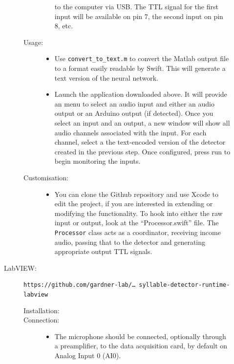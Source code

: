 \documentclass[10pt,letterpaper]{article}
\begin{document}
\begin{description}
\begin{description}
\begin{description}
\begin{itemize}
      to the computer via USB. The TTL signal for the first input will be available on 
      pin 7, the second input on pin 8, etc.
      \end{itemize}
    \item[Usage:]\hfill
      \begin{itemize}
      \item Use {\tt convert\_to\_text.m} to convert the Matlab output file to a format 
      easily readable by Swift. This will generate a text version of the neural network.
      \item Launch the application downloaded above. It will provide an 
      menu to select an audio input and either an audio output or an Arduino output (if 
      detected). Once you select an input and an output, a new window will show all audio 
      channels associated with the input. For each channel, select a the text-encoded version of 
      the detector created in the previous step. Once configured, press run to begin 
      monitoring the inputs.
      \end{itemize}
    \item[Customisation:]\hfill
      \begin{itemize}
      \item You can clone the Github repository and use Xcode to edit the project, if you 
      are interested in extending or modifying the functionality. To hook into either 
      the raw input or output, look at the ``Processor.swift'' file. The 
      {\tt Processor} class acts as a coordinator, receiving income audio, passing that
      to the detector and generating appropriate output TTL signals.
      \end{itemize}
    \end{description}
  \item[LabVIEW:] {\tt https://github.com/gardner-lab/\dots\ syllable-detector-runtime-labview}
    \begin{description}
    \item[Installation:]\hfill
    \item[Connection:]\hfill
      \begin{itemize}
      \item The microphone should be connected, optionally through a preamplifier, to the data acquisition card, by default on Analog Input 0 (AI0).

\end{itemize}
\end{description}
\end{description}
\end{description}
\end{document}
